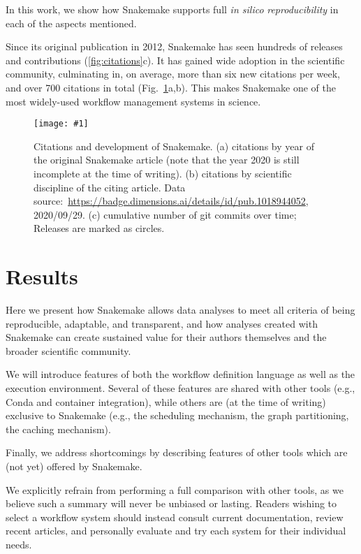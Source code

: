 \documentclass[parskip=half]{scrartcl}
\newcommand{\image}[1]{\centering\texttt{[image: \#1]}}
\let\plainurl\url
\renewcommand{\url}[1]{\protect\plainurl{#1}}
\begin{document}
In this work, we show how Snakemake supports full \emph{in silico} \emph{reproducibility} in each of the aspects mentioned.

Since its original publication in 2012, Snakemake has seen hundreds of releases and contributions (\autoref{fig:citations}c).
It has gained wide adoption in the scientific community, culminating in, on average, more than six new citations per week, and over 700 citations in total (Fig.~\ref{fig:citations}a,b). This makes Snakemake one of the most widely-used workflow management systems in science.

\begin{figure}
	\image{citations+development.pdf}
	\caption{
		Citations and development of Snakemake.
		(a) citations by year of the original Snakemake article (note that the year 2020 is still incomplete at the time of writing).
		(b) citations by scientific discipline of the citing article.
		Data source:~\url{https://badge.dimensions.ai/details/id/pub.1018944052}, 2020/09/29.
		(c) cumulative number of git commits over time; Releases are marked as circles.
	}
	\label{fig:citations}
\end{figure}

\section{Results}

Here we present how Snakemake allows data analyses to meet all criteria of being reproducible, adaptable, and transparent, and how analyses created with Snakemake can create sustained value for their authors themselves and the broader scientific community.

We will introduce features of both the workflow definition language as well as the execution environment.
Several of these features are shared with other tools (e.g., Conda and container integration), while others are (at the time of writing) exclusive to Snakemake (e.g., the scheduling mechanism, the graph partitioning, the caching mechanism).

Finally, we address shortcomings by describing features of other tools which are (not yet) offered by Snakemake.

We explicitly refrain from performing a full comparison with other tools, as we believe such a summary will never be unbiased or lasting. Readers wishing to select a workflow system should instead consult current documentation, review recent articles, and personally evaluate and try each system for their individual needs.
\end{document}
